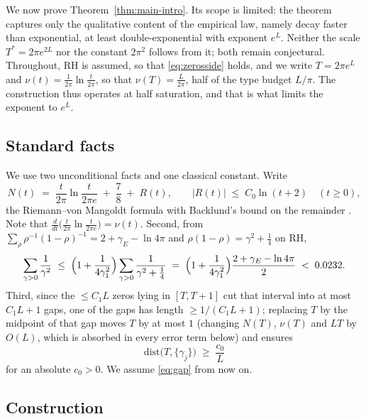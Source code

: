 ﻿\documentclass[11pt]{article}
\newcommand{\Tstar}{T^{*}}
\begin{document}
We now prove Theorem~\ref{thm:main-intro}.  Its scope is limited: the
theorem captures only the qualitative content of the empirical law,
namely decay faster than exponential, at least double-exponential with
exponent $e^{L}$.  Neither the scale $\Tstar=2\pi e^{2L}$ nor the
constant $2\pi^{2}$ follows from it; both remain conjectural.
Throughout, RH is assumed, so that \eqref{eq:zerosside} holds, and we
write $T=2\pi e^{L}$ and $\nu(t)=\frac1{2\pi}\ln\frac{t}{2\pi}$, so
that $\nu(T)=\frac{L}{2\pi}$, half of the type budget $L/\pi$.  The
construction thus operates at half saturation, and that is what limits
the exponent to $e^{L}$.

\subsection{Standard facts}

We use two unconditional facts and one classical constant.  Write
\begin{equation}\label{eq:RvM}
  N(t)\;=\;\frac{t}{2\pi}\ln\frac{t}{2\pi e}\;+\;\frac78\;+\;R(t),
  \qquad |R(t)|\;\le\;C_0\ln(t+2)\quad(t\ge0),
\end{equation}
the Riemann--von Mangoldt formula with Backlund's bound on the
remainder \cite[\S9.3--9.4]{Titchmarsh1986}.  Note that
$\frac{d}{dt}\bigl(\frac{t}{2\pi}\ln\frac{t}{2\pi e}\bigr)=\nu(t)$.
Second, from $\sum_{\rho}\rho^{-1}(1-\rho)^{-1}=2+\gamma_E-\ln4\pi$
\cite[Ch.~12]{Davenport2000} and $\rho(1-\rho)=\gamma^2+\tfrac14$ on
RH,
\begin{equation}\label{eq:gammasum}
  \sum_{\gamma>0}\frac{1}{\gamma^{2}}
  \;\le\;\Bigl(1+\frac{1}{4\gamma_1^{2}}\Bigr)
  \sum_{\gamma>0}\frac{1}{\gamma^{2}+\frac14}
  \;=\;\Bigl(1+\frac{1}{4\gamma_1^{2}}\Bigr)
  \frac{2+\gamma_E-\ln4\pi}{2}\;<\;0.0232 .
\end{equation}
Third, since the $\le C_1L$ zeros lying in $[T,T+1]$ cut that interval
into at most $C_1L+1$ gaps, one of the gaps has length
$\ge1/(C_1L+1)$; replacing $T$ by the midpoint of that gap moves $T$
by at most $1$ (changing $N(T)$, $\nu(T)$ and $LT$ by $O(L)$, which is
absorbed in every error term below) and ensures
\begin{equation}\label{eq:gap}
  \mathrm{dist}\bigl(T,\{\gamma_j\}\bigr)\;\ge\;\frac{c_0}{L}
\end{equation}
for an absolute $c_0>0$.  We assume \eqref{eq:gap} from now on.

\subsection{Construction}
\end{document}
